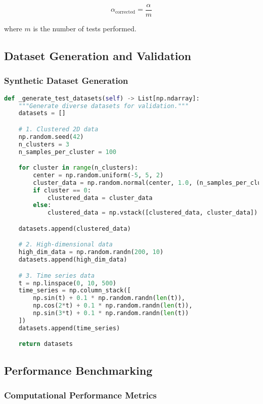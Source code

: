 \begin{equation}
\alpha_{\text{corrected}} = \frac{\alpha}{m}
\end{equation}

where $m$ is the number of tests performed.

\subsection{Dataset Generation and Validation}

\subsubsection{Synthetic Dataset Generation}

\begin{lstlisting}[language=Python, caption=Dataset generation]
def _generate_test_datasets(self) -> List[np.ndarray]:
    """Generate diverse datasets for validation."""
    datasets = []

    # 1. Clustered 2D data
    np.random.seed(42)
    n_clusters = 3
    n_samples_per_cluster = 100

    for cluster in range(n_clusters):
        center = np.random.uniform(-5, 5, 2)
        cluster_data = np.random.normal(center, 1.0, (n_samples_per_cluster, 2))
        if cluster == 0:
            clustered_data = cluster_data
        else:
            clustered_data = np.vstack([clustered_data, cluster_data])

    datasets.append(clustered_data)

    # 2. High-dimensional data
    high_dim_data = np.random.randn(200, 10)
    datasets.append(high_dim_data)

    # 3. Time series data
    t = np.linspace(0, 10, 500)
    time_series = np.column_stack([
        np.sin(t) + 0.1 * np.random.randn(len(t)),
        np.cos(2*t) + 0.1 * np.random.randn(len(t)),
        np.sin(3*t) + 0.1 * np.random.randn(len(t))
    ])
    datasets.append(time_series)

    return datasets
\end{lstlisting}

\subsection{Performance Benchmarking}

\subsubsection{Computational Performance Metrics}

